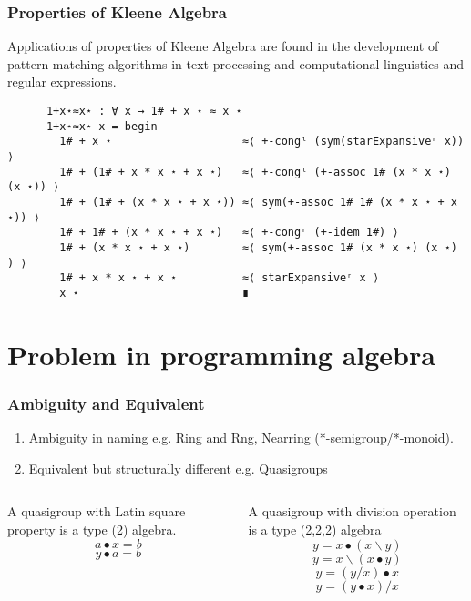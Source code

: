 \documentclass[xcolor={dvipsnames}]{beamer}
\begin{document}
\begin{frame}[fragile]
    \frametitle{Properties of Kleene Algebra}  
    Applications of properties of Kleene Algebra are found in the development of
    pattern-matching algorithms in text processing and computational linguistics
    and regular expressions.
    \\
    \begin{verbatim}
      1+x⋆≈x⋆ : ∀ x → 1# + x ⋆ ≈ x ⋆
      1+x⋆≈x⋆ x = begin
        1# + x ⋆                    ≈⟨ +-congˡ (sym(starExpansiveʳ x)) ⟩ 
        1# + (1# + x * x ⋆ + x ⋆)   ≈⟨ +-congˡ (+-assoc 1# (x * x ⋆) (x ⋆)) ⟩ 
        1# + (1# + (x * x ⋆ + x ⋆)) ≈⟨ sym(+-assoc 1# 1# (x * x ⋆ + x ⋆)) ⟩ 
        1# + 1# + (x * x ⋆ + x ⋆)   ≈⟨ +-congʳ (+-idem 1#) ⟩ 
        1# + (x * x ⋆ + x ⋆)        ≈⟨ sym(+-assoc 1# (x * x ⋆) (x ⋆) ) ⟩ 
        1# + x * x ⋆ + x ⋆          ≈⟨ starExpansiveʳ x ⟩ 
        x ⋆                         ∎
      \end{verbatim}
  \end{frame}
\section{Problem in programming algebra}

\begin{frame}
  \frametitle{Ambiguity and Equivalent}
  \begin{enumerate}
    \item Ambiguity in naming e.g. Ring and Rng, Nearring (*-semigroup/*-monoid). 
    \item Equivalent but structurally different e.g. Quasigroups
  \end{enumerate}
  \begin{columns}
    \begin{column}{0.4\textwidth}
      A quasigroup with Latin square property is a type (2) algebra.
      \[a ∙ x = b\]
      \[y ∙ a = b\]
    \end{column}
    \begin{column}{0.575\textwidth}
      A quasigroup with division operation is a type (2,2,2) algebra
      \[y=x∙(x\backslash y)\]
      \[y=x\backslash(x∙y)\]
      \[y=(y/x)∙x\]
      \[y=(y∙x)/x\]
    \end{column}
  \end{columns}
\end{frame}
\end{document}

